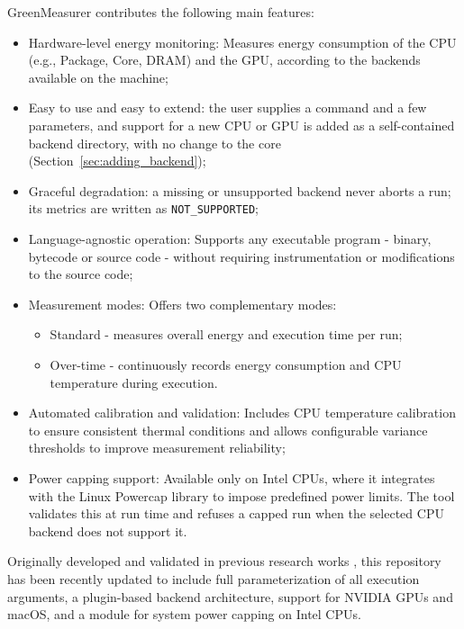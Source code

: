 GreenMeasurer contributes the following main features:
\begin{itemize}
    \item Hardware-level energy monitoring: Measures energy consumption of the CPU (e.g., Package, Core, DRAM) and the GPU, according to the backends available on the machine;
    \item Easy to use and easy to extend: the user supplies a command and a few parameters, and support for a new CPU or GPU is added as a self-contained backend directory, with no change to the core (Section~\ref{sec:adding_backend});
    \item Graceful degradation: a missing or unsupported backend never aborts a run; its metrics are written as \texttt{NOT\_SUPPORTED};
    \item Language-agnostic operation: Supports any executable program - binary, bytecode or source code - without requiring instrumentation or modifications to the source code;
    \item Measurement modes: Offers two complementary modes: 
    \begin{itemize}
        \item Standard - measures overall energy and execution time per run;
        \item Over-time - continuously records energy consumption and CPU temperature during execution.
    \end{itemize}
    \item Automated calibration and validation: Includes CPU temperature calibration to ensure consistent thermal conditions and allows configurable variance thresholds to improve measurement reliability;
    \item Power capping support: Available only on Intel CPUs, where it integrates with the Linux Powercap library \cite{powercap2025} to impose predefined power limits. The tool validates this at run time and refuses a capped run when the selected CPU backend does not support it.
\end{itemize}

Originally developed and validated in previous research works \cite{10.1145/3136014.3136031, PEREIRA2021102609,10.1145/3687997.3695638}, this repository has been recently updated to include full parameterization of all execution arguments, a plugin-based backend architecture, support for NVIDIA GPUs and macOS, and a module for system power capping \cite{powercap2025} on Intel CPUs.

